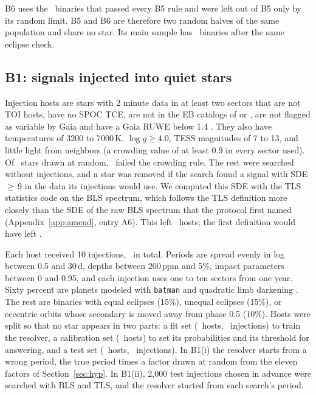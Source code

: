 \documentclass[twocolumn,linenumbers]{aastex701}
\begin{document}
B6 uses the \bSixIncluded\ binaries that passed every B5 rule and were left out of B5 only by its random limit. B5 and B6 are therefore two random halves of the same population and share no star. Its main sample has \bSixN\ binaries after the same eclipse check.

\subsection{B1: signals injected into quiet stars} \label{sec:b1data}

Injection hosts are stars with 2 minute data in at least two sectors that are not TOI hosts, have no SPOC TCE, are not in the EB catalogs of \citet{Prsa2022} or \citet{Kostov2025}, are not flagged as variable by Gaia and have a Gaia RUWE below 1.4 \citep{GaiaDR3}. They also have temperatures of 3200 to 7000\,K, $\log g \ge 4.0$, TESS magnitudes of 7 to 13, and little light from neighbors (a crowding value of at least 0.9 in every sector used). Of \poolFrozen\ stars drawn at random, \poolPseven\ failed the crowding rule. The rest were searched without injections, and a star was removed if the search found a signal with SDE\,$\ge$\,9 in the data its injections would use. We computed this SDE with the TLS statistics code on the BLS spectrum, which follows the TLS definition more closely than the SDE of the raw BLS spectrum that the protocol first named (Appendix~\ref{app:amend}, entry A6). This left \poolScreened\ hosts; the first definition would have left \poolScreenedRaw.

Each host received 10 injections, \bOneInj\ in total. Periods are spread evenly in log between 0.5 and 30\,d, depths between 200\,ppm and 5\%, impact parameters between 0 and 0.95, and each injection uses one to ten sectors from one year. Sixty percent are planets modeled with \texttt{batman} \citep{Kreidberg2015} and quadratic limb darkening \citep{Claret2017}. The rest are binaries with equal eclipses (15\%), unequal eclipses (15\%), or eccentric orbits whose secondary is moved away from phase 0.5 (10\%). Hosts were split so that no star appears in two parts: a fit set (\bOneHostsFit\ hosts, \bOneInjFit\ injections) to train the resolver, a calibration set (\bOneHostsCalib\ hosts) to set its probabilities and its threshold for answering, and a test set (\bOneHostsTest\ hosts, \bOneInjTest\ injections). In B1(i) the resolver starts from a wrong period, the true period times a factor drawn at random from the eleven factors of Section~\ref{sec:hyp}. In B1(ii), 2{,}000 test injections chosen in advance were searched with BLS and TLS, and the resolver started from each search's period.
\end{document}

